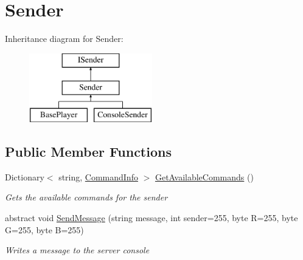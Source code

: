 \hypertarget{classOTA_1_1Command_1_1Sender}{}\section{Sender}
\label{classOTA_1_1Command_1_1Sender}
Inheritance diagram for Sender\+:\begin{figure}[H]
\begin{center}
\leavevmode
\includegraphics[height=3.000000cm]{classOTA_1_1Command_1_1Sender}
\end{center}
\end{figure}
\subsection*{Public Member Functions}
\begin{DoxyCompactItemize}
\item 
Dictionary$<$ string, \hyperlink{classOTA_1_1Command_1_1CommandInfo}{Command\+Info} $>$ \hyperlink{classOTA_1_1Command_1_1Sender_a815cfd7f711a32a0f3c4c8b129d08c01}{Get\+Available\+Commands} ()
\begin{DoxyCompactList}\small\item\em Gets the available commands for the sender \end{DoxyCompactList}\item 
abstract void \hyperlink{classOTA_1_1Command_1_1Sender_a88442a754fb4b417ea6f7fcb0058b75e}{Send\+Message} (string message, int sender=255, byte R=255, byte G=255, byte B=255)
\begin{DoxyCompactList}\small\item\em Writes a message to the server console \end{DoxyCompactList}\end{DoxyCompactItemize}

